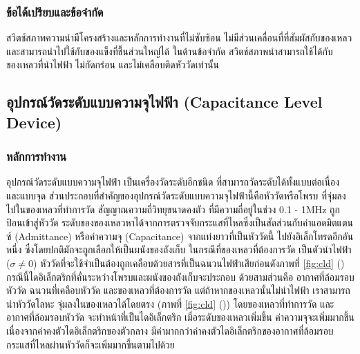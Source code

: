 \documentclass[final,11pt]{article}
\begin{document}
\subsubsection{ข้อได้เปรียบและข้อจำกัด}
สวิตช์สภาพความนำมีโครงสร้างและหลักการทำงานที่ไม่ซับซ้อน ไม่มีส่วนเคลื่อนที่ที่สัมผัสกับของเหลว และสามารถนำไปใช้กับของแข็งที่ชื้นส่วนใหญ่ได้ 
ในด้านข้อจำกัด สวิตช์สภาพนำสามารถใช้ได้กับของเหลวที่นำไฟฟ้า ไม่กัดกร่อน และไม่เคลือบติดหัววัดเท่านั้น

\subsection{อุปกรณ์วัดระดับแบบความจุไฟฟ้า (Capacitance Level Device)}
\subsubsection{หลักการทำงาน} 
อุปกรณ์วัดระดับแบบความจุไฟฟ้า เป็นเครื่องวัดระดับอีกชนิด ที่สามารถวัดระดับได้ทั้งแบบต่อเนื่อง และแบบจุด 
ส่วนประกอบที่สำคัญของอุปกรณ์วัดระดับแบบความจุไฟฟ้านี้คือหัววัดหรือโพรบ ที่จุ่มลงไปในของเหลวที่ทำการวัด สัญญาณความถี่วิทยุขนาดคงตัว
ที่มีความถี่อยู่ในช่วง 0.1 - 1MHz ถูกป้อนเข้าสู่หัววัด ระดับของของเหลวหาได้จากการตรวจจับกระแสที่ไหลซึ่งเป็นสัดส่วนกับค่าแอดมิตแตนซ์ (Admittance) 
หรือค่าความจุ (Capacitance) จากแท่งยาวที่เป็นหัววัดนี้ ไปยังอิเล็กโทรดอีกอันหนึ่ง ซึ่งโดยปกติมักจะถูกเลือกให้เป็นผนังของถังเก็บ ในกรณีที่ของเหลวที่ต้องการวัด
เป็นตัวนำไฟฟ้า ($\sigma \neq 0$) หัววัดที่จะใช้จำเป็นต้องถูกเคลือบด้วยสารที่เป็นฉนวนไฟฟ้าเสียก่อนดังภาพที่ \ref{fig:cld} ()  กรณีนี้ไดอิเล็กตริกที่คั่นระหว่างโพรบและผนังของถังเก็บจะประกอบ
ด้วยสามส่วนคือ อากาศที่ล้อมรอบหัววัด ฉนวนที่เคลือบหัววัด และของเหลวที่ต้องการวัด แต่ถ้าหากของเหลวนั้นไม่นำไฟฟ้า เราสามารถนำหัววัดโลหะ
จุ่มลงในของเหลวได้โดยตรง (ภาพที่ \ref{fig:cld} ()) โดยของเหลวที่ทำการวัด และอากาศที่ล้อมรอบหัววัด จะทำหน้าที่เป็นไดอิเล็กตริก เมื่อระดับของเหลวเพิ่มขึ้น 
ค่าความจุจะเพิ่มมากขึ้น เนื่องจากค่าคงตัวไดอิเล็กตริกของตัวกลาง มีค่ามากกว่าค่าคงตัวไดอิเล็กตริกของอากาศที่ล้อมรอบ กระแสที่ไหลผ่านหัววัดก็จะเพิ่มมากขึ้นตามไปด้วย
\end{document}
